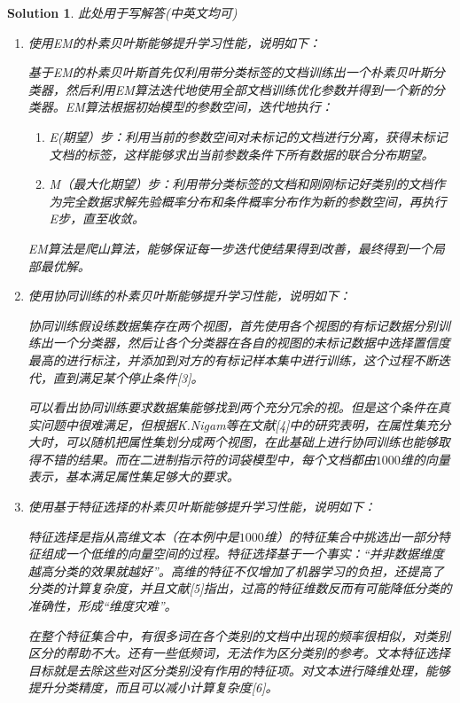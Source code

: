 \documentclass[a4paper,UTF8]{article}
\numberwithin{equation}{section}
\newtheorem*{solution}{Solution}
\begin{document}
\begin{solution}
此处用于写解答(中英文均可)
	\begin{enumerate}
		\item 使用EM的朴素贝叶斯能够提升学习性能，说明如下：

		基于EM的朴素贝叶斯首先仅利用带分类标签的文档训练出一个朴素贝叶斯分类器，然后利用EM算法迭代地使用全部文档训练优化参数并得到一个新的分类器。EM算法根据初始模型的参数空间，迭代地执行：
		\begin{enumerate}[(1)]
			\item E(期望）步：利用当前的参数空间对未标记的文档进行分离，获得未标记文档的标签，这样能够求出当前参数条件下所有数据的联合分布期望。
			\item M（最大化期望）步：利用带分类标签的文档和刚刚标记好类别的文档作为完全数据求解先验概率分布和条件概率分布作为新的参数空间，再执行E步，直至收敛。
		\end{enumerate}

		EM算法是爬山算法，能够保证每一步迭代使结果得到改善，最终得到一个局部最优解。

		\item 使用协同训练的朴素贝叶斯能够提升学习性能，说明如下：

		协同训练假设练数据集存在两个视图，首先使用各个视图的有标记数据分别训练出一个分类器，然后让各个分类器在各自的视图的未标记数据中选择置信度最高的进行标注，并添加到对方的有标记样本集中进行训练，这个过程不断迭代，直到满足某个停止条件[3]。

		可以看出协同训练要求数据集能够找到两个充分冗余的视。但是这个条件在真实问题中很难满足，但根据K.Nigam等在文献[4]中的研究表明，在属性集充分大时，可以随机把属性集划分成两个视图，在此基础上进行协同训练也能够取得不错的结果。而在二进制指示符的词袋模型中，每个文档都由$1000$维的向量表示，基本满足属性集足够大的要求。
		\item 使用基于特征选择的朴素贝叶斯能够提升学习性能，说明如下：

		特征选择是指从高维文本（在本例中是$1000$维）的特征集合中挑选出一部分特征组成一个低维的向量空间的过程。特征选择基于一个事实：“并非数据维度越高分类的效果就越好”。高维的特征不仅增加了机器学习的负担，还提高了分类的计算复杂度，并且文献[5]指出，过高的特征维数反而有可能降低分类的准确性，形成“维度灾难”。

		在整个特征集合中，有很多词在各个类别的文档中出现的频率很相似，对类别区分的帮助不大。还有一些低频词，无法作为区分类别的参考。文本特征选择目标就是去除这些对区分类别没有作用的特征项。对文本进行降维处理，能够提升分类精度，而且可以减小计算复杂度[6]。


	\end{enumerate}
\end{solution}
\newpage
\end{document}
